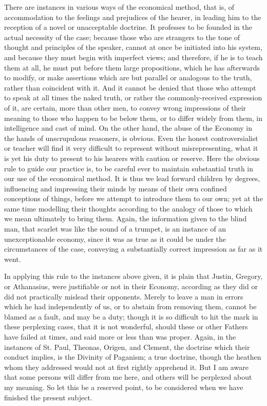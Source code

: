 There are instances in various ways of the economical method, that
is, of accommodation to the feelings and prejudices of the hearer, in
leading him to the reception of a novel or unacceptable doctrine.
It professes to be founded in the actual necessity of the case;
because those who are strangers to the tone of thought and principles
of the speaker, cannot at once be initiated into his system, and
because they must begin with imperfect views; and therefore, if he is
to teach them at all, he must put before them large propositions,
which he has afterwards to modify, or make assertions which are but
parallel or analogous to the truth, rather than coincident with it.
And it cannot be denied that those who attempt to speak at all times
the naked truth, or rather the commonly-received expression of it, are
certain, more than other men, to convey wrong impressions of their
meaning to those who happen to be below them, or to differ widely from
them, in intelligence and cast of mind. On the other hand, the abuse
of the Economy in the hands of unscrupulous reasoners, is obvious.
Even the honest controversialist or teacher will find it very
difficult to represent without misrepresenting, what it is yet his
duty to present to his hearers with caution or reserve. Here the
obvious rule to guide our practice is, to be careful ever to maintain
substantial truth in our use of the economical method. It is thus we
lead forward children by degrees, influencing and impressing their
minds by means of their own confined conceptions of things, before we
attempt to introduce them to our own; yet at the same time modelling
their thoughts according to the analogy of those to which we mean
ultimately to bring them. Again, the information given to the blind
man, that scarlet was like the sound of a trumpet, is an instance of
an unexceptionable economy, since it was as true as it could be
under the circumstances of the case, conveying a substantially correct
impression as far as it went.

In applying this rule to the instances above given, it is plain
that Justin, Gregory, or Athanasius, were justifiable or not in their
Economy, according as they did or did not practically mislead their
opponents. Merely to leave a man in errors which he had independently
of us, or to abstain from removing them, cannot be blamed as a fault,
and may be a duty; though it is so difficult to hit the mark in these
perplexing cases, that it is not wonderful, should these or other
Fathers have failed at times, and said more or less than was proper.
Again, in the instances of St. Paul, Theonas, Origen, and Clement, the
doctrine which their conduct implies, is the Divinity of Paganism; a
true doctrine, though the heathen whom they addressed would not at
first rightly apprehend it. But I am aware that some persons will
differ from me here, and others will be perplexed about my meaning. So
let this be a reserved point, to be considered when we have finished
the present subject.


